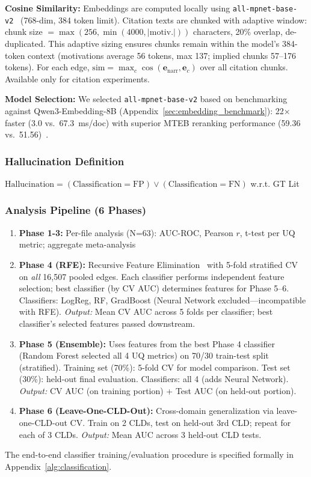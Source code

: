 \textbf{Cosine Similarity:} Embeddings are computed locally using \texttt{all-mpnet-base-v2}~\cite{reimers2019sentencebert} (768-dim, 384 token limit). Citation texts are chunked with adaptive window: chunk size $= \max(256, \min(4000, |\text{motiv.}|))$ characters, 20\% overlap, de-duplicated. This adaptive sizing ensures chunks remain within the model's 384-token context (motivations average 56 tokens, max 137; implied chunks 57--176 tokens). For each edge, $\text{sim} = \max_c \cos(\mathbf{e}_{\text{narr}}, \mathbf{e}_c)$ over all citation chunks. Available only for citation experiments.

\textbf{Model Selection:} We selected \texttt{all-mpnet-base-v2} based on benchmarking against Qwen3-Embedding-8B (Appendix~\ref{sec:embedding_benchmark}): 22$\times$ faster (3.0 vs.\ 67.3~ms/doc) with superior MTEB reranking performance (59.36 vs.\ 51.56)~\cite{muennighoff2023mteb}.

\subsubsection{Hallucination Definition}
$\text{Hallucination} = (\text{Classification} = \text{FP}) \lor (\text{Classification} = \text{FN})$ w.r.t. GT Lit

\subsubsection{Analysis Pipeline (6 Phases)}
\begin{enumerate}[noitemsep]
    \item \textbf{Phase 1-3:} Per-file analysis (N=63): AUC-ROC, Pearson $r$, t-test per UQ metric; aggregate meta-analysis
    \item \textbf{Phase 4 (RFE):} Recursive Feature Elimination~\cite{pedregosa2011sklearn} with 5-fold stratified CV on \textit{all} 16,507 pooled edges. Each classifier performs independent feature selection; best classifier (by CV AUC) determines features for Phase 5--6. Classifiers: LogReg, RF, GradBoost (Neural Network excluded---incompatible with RFE). \textit{Output:} Mean CV AUC across 5 folds per classifier; best classifier's selected features passed downstream.
    \item \textbf{Phase 5 (Ensemble):} Uses features from the best Phase 4 classifier (Random Forest selected all 4 UQ metrics) on 70/30 train-test split (stratified). Training set (70\%): 5-fold CV for model comparison. Test set (30\%): held-out final evaluation. Classifiers: all 4 (adds Neural Network). \textit{Output:} CV AUC (on training portion) + Test AUC (on held-out portion).
    \item \textbf{Phase 6 (Leave-One-CLD-Out):} Cross-domain generalization via leave-one-CLD-out CV. Train on 2 CLDs, test on held-out 3rd CLD; repeat for each of 3 CLDs. \textit{Output:} Mean AUC across 3 held-out CLD tests.
\end{enumerate}
The end-to-end classifier training/evaluation procedure is specified formally in Appendix~\ref{alg:classification}.

